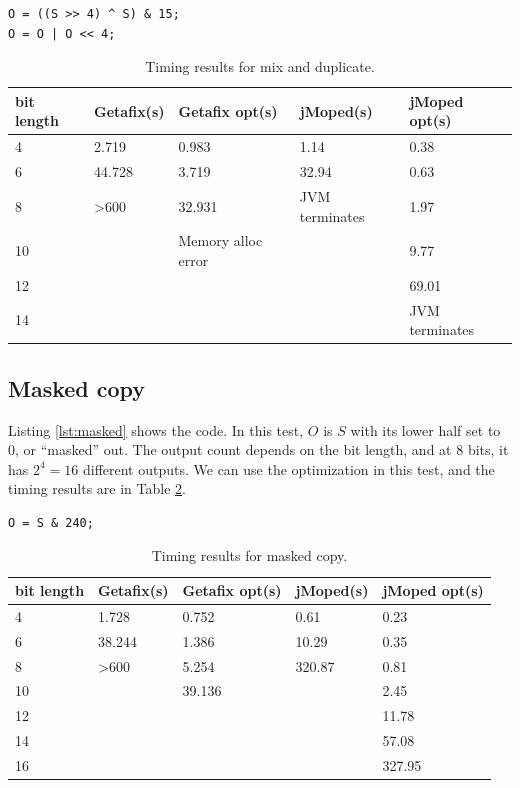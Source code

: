 \lstset{language=C}  
\begin{lstlisting}[float=!h, caption={Mix and duplicate test program at 8 bits.},label=lst:mix]
O = ((S >> 4) ^ S) & 15;
O = O | O << 4;
\end{lstlisting}
\begin{table}[htbp]
\begin{center}
\begin{tabular}{|l|l|l|l|l|}
\hline
bit length & Getafix(s) & Getafix opt(s) & jMoped(s) & jMoped opt(s) \\ \hline
4 & 2.719 & 0.983 & 1.14 & 0.38 \\ \hline
6 & 44.728 & 3.719 & 32.94 & 0.63 \\ \hline
8 & \textgreater600 & 32.931 & JVM terminates & 1.97 \\ \hline
10 &  & Memory alloc error &  & 9.77 \\ \hline
12 &  &  &  & 69.01 \\ \hline
14 &  &  &  & JVM terminates \\ \hline
\end{tabular}
\end{center}
\caption{Timing results for mix and duplicate.}
\label{tbl:mix}
\end{table}

\subsection{Masked copy}
Listing \ref{lst:masked} shows the code. In this test, $O$ is $S$ with its lower half set to $0$, or ``masked'' out. The output count depends on the bit length, and at $8$ bits, it has $2^{4} = 16$ different outputs. We can use the optimization in this test, and the timing results are in Table \ref{tbl:masked}.

\lstset{language=C}  
\begin{lstlisting}[float=!h, caption={Masked copy test program at 8 bits.},label=lst:masked]
O = S & 240;
\end{lstlisting}

\begin{table}[!h]
\begin{center}
\begin{tabular}{|l|l|l|l|l|}
\hline
bit length & Getafix(s) & Getafix opt(s) & jMoped(s) & jMoped opt(s) \\ \hline
4 & 1.728 & 0.752 & 0.61 & 0.23 \\ \hline
6 & 38.244 & 1.386 & 10.29 & 0.35 \\ \hline
8 & \textgreater600 & 5.254 & 320.87 & 0.81 \\ \hline
10 &  & 39.136 &  & 2.45 \\ \hline
12 &  &  &  & 11.78 \\ \hline
14 &  &  &  & 57.08 \\ \hline
16 &  &  &  & 327.95 \\ \hline
\end{tabular}
\end{center}
\caption{Timing results for masked copy.}
\label{tbl:masked}
\end{table}

